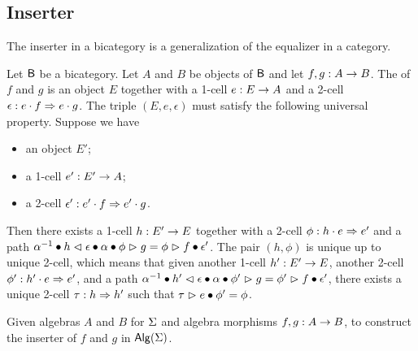 \subsection{Inserter}
The inserter in a bicategory is a generalization of the equalizer in
a category.

\begin{definition}\label{def:inserter}
Let $\B$ be a bicategory. Let $A$ and $B$ be objects of $\B$ and let
$f,g : A \onecell B$. The  of $f$ and $g$ is an
object $E$ together with a 1-cell $e : E \onecell A$ and a 2-cell
$\epsilon : e \cdot f\twocell e \cdot g$.
The triple $(E,e,\epsilon)$ must satisfy the following universal
property. Suppose we have
\begin{itemize}
\item an object $E'$;
\item a 1-cell $e' : E' \onecell A$;
\item a 2-cell $\epsilon' : e' \cdot f \twocell e' \cdot g$.
\end{itemize}
Then there exists a 1-cell $h : E' \onecell E$ together with a 2-cell
$\phi : h \cdot e \twocell e'$ and a path $\rassoc{h}{e}{f} \vcomp
h \whiskerl \epsilon \vcomp \lassoc{h}{e}{g} \vcomp \phi \whiskerr g
= \phi \whiskerr f \vcomp \epsilon'$.
The pair $(h,\phi)$ is unique up to unique 2-cell, which means that
given another 1-cell $h' : E' \onecell E$, another 2-cell $\phi' :
h' \cdot e \twocell e'$, and a path $\rassoc{h'}{e}{f} \vcomp
h' \whiskerl \epsilon \vcomp \lassoc{h'}{e}{g} \vcomp \phi' \whiskerr g
= \phi' \whiskerr f \vcomp \epsilon'$, there exists a unique 2-cell $\tau : h
\twocell h'$ such that $\tau \whiskerr e \vcomp \phi' = \phi$.
\end{definition}

\begin{problem}
\label{prob:inserter}
Given algebras $A$ and $B$ for $\sign$ and
algebra morphisms $f,g : A \onecell B$, to construct the inserter of $f$ and $g$ in $\alg(\sign)$.
\end{problem}

